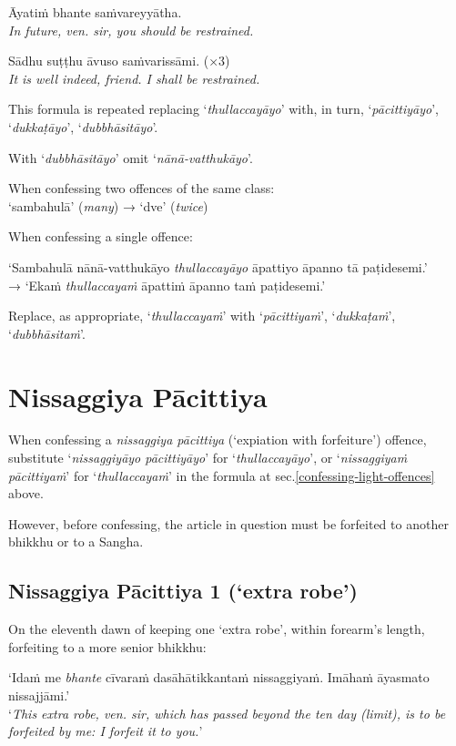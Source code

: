 \hangindent=25pt%
\parbox{22pt}{} Āyatiṁ bhante saṁvareyyātha.\\ \emph{In future, ven. sir, you should be restrained.}

\hangindent=25pt%
\parbox{22pt}{} Sādhu suṭṭhu āvuso saṁvarissāmi. (×3)\\ \emph{It is well indeed, friend. I shall be restrained.}

This formula is repeated replacing ‘\emph{thullaccayāyo}’ with, in turn, ‘\emph{pācittiyāyo}’,
‘\emph{dukkaṭāyo}’, ‘\emph{dubbhāsitāyo}’.

With ‘\emph{dubbhāsitāyo}’ omit ‘\emph{nānā-vatthukāyo}’.

When confessing two offences of the same class:\\
‘sambahulā’ (\emph{many}) → ‘dve’ (\emph{twice})

When confessing a single offence:

‘Sambahulā nānā-vatthukāyo \emph{thullaccayāyo} āpattiyo āpanno tā paṭidesemi.’\\
→ ‘Ekaṁ \emph{thullaccayaṁ} āpattiṁ āpanno taṁ paṭidesemi.’

Replace, as appropriate, ‘\emph{thullaccayaṁ}’ with ‘\emph{pācittiyaṁ}’, ‘\emph{dukkaṭaṁ}’, ‘\emph{dubbhāsitaṁ}’.

\section{Nissaggiya Pācittiya}

When confessing a \emph{nissaggiya pācittiya} (‘expiation with forfeiture’)
offence, substitute ‘\emph{nissaggiyāyo pācittiyāyo}’ for
‘\emph{thullaccayāyo}’, or ‘\emph{nissaggiyaṁ pācittiyaṁ}’ for
‘\emph{thullaccayaṁ}’ in the formula at sec.\ref{confessing-light-offences}
above.

However, before confessing, the article in question must be forfeited to another
bhikkhu or to a Sangha. 

\subsection[NP 1 (‘extra robe’)]{Nissaggiya Pācittiya 1 (‘extra robe’)}
\label{np-1-extra-robe}

On the eleventh dawn of keeping one ‘extra robe’, within forearm's length,
forfeiting to a more senior bhikkhu:

‘Idaṁ me \emph{bhante} cīvaraṁ dasāhātikkantaṁ nissaggiyaṁ. Imāhaṁ āyasmato nissajjāmi.’\\
‘\emph{This extra robe, ven. sir, which has passed beyond the ten day (limit), is
  to be forfeited by me: I forfeit it to you.}’

